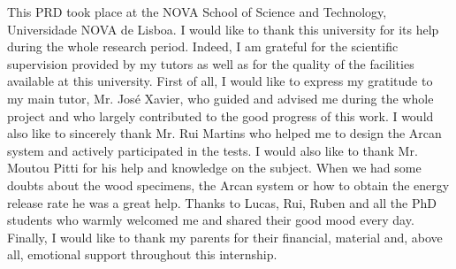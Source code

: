 \documentclass[
11pt, %
oneside, %
english, %
singlespacing, %
parskip, %
headsepline, %
chapterinoneline, %
]{MastersDoctoralThesis} %
\begin{document}

\begin{acknowledgements}
\addchaptertocentry{\acknowledgementname} %
\vspace{2cm}
This PRD took place at the NOVA School of Science and Technology, Universidade NOVA de Lisboa. I would like to thank this university for its help during the whole research period. Indeed, I am grateful for the scientific supervision provided by my tutors as well as for the quality of the facilities available at this university.
First of all, I would like to express my gratitude to my main tutor, Mr. José Xavier, who guided and advised me during the whole project and who largely contributed to the good progress of this work. 
I would also like to sincerely thank Mr. Rui Martins who helped me to design the Arcan system and actively participated in the tests.
I would also like to thank Mr. Moutou Pitti for his help and knowledge on the subject. When we had some doubts about the wood specimens, the Arcan system or how to obtain the energy release rate he was a great help.
Thanks to Lucas, Rui, Ruben and all the PhD students who warmly welcomed me and shared their good mood every day.
Finally, I would like to thank my parents for their financial, material and, above all, emotional support throughout this internship.

\end{acknowledgements}
\end{document}
